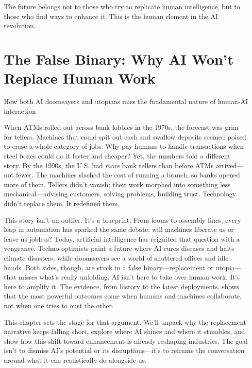 \documentclass[
  Letterpaper,
]{scrbook}
\begin{document}
The future belongs not to those who try to replicate human intelligence,
but to those who find ways to enhance it. This is the human element in
the AI revolution.


\chapter{The False Binary: Why AI Won't Replace Human
Work}\label{the-false-binary-why-ai-wont-replace-human-work}

How both AI doomsayers and utopians miss the fundamental nature of
human-AI interaction

\hfill\break

When ATMs rolled out across bank lobbies in the 1970s, the forecast was
grim for tellers. Machines that could spit out cash and swallow deposits
seemed poised to erase a whole category of jobs. Why pay humans to
handle transactions when steel boxes could do it faster and cheaper?
Yet, the numbers told a different story. By the 1990s, the U.S. had
\emph{more} bank tellers than before ATMs arrived---not fewer. The
machines slashed the cost of running a branch, so banks opened more of
them. Tellers didn't vanish; their work morphed into something less
mechanical---advising customers, solving problems, building trust.
Technology didn't replace them. It redefined them.

This story isn't an outlier. It's a blueprint. From looms to assembly
lines, every leap in automation has sparked the same debate: will
machines liberate us or leave us jobless? Today, artificial intelligence
has reignited that question with a vengeance. Techno-optimists paint a
future where AI cures diseases and halts climate disasters, while
doomsayers see a world of shuttered offices and idle hands. Both sides,
though, are stuck in a false binary---replacement or utopia---that
misses what's really unfolding. AI isn't here to take over human work.
It's here to amplify it. The evidence, from history to the latest
deployments, shows that the most powerful outcomes come when humans and
machines collaborate, not when one tries to oust the other.

This chapter sets the stage for that argument. We'll unpack why the
replacement narrative keeps falling short, explore where AI shines and
where it stumbles, and show how this shift toward enhancement is already
reshaping industries. The goal isn't to dismiss AI's potential or its
disruptions---it's to reframe the conversation around what it can
realistically do alongside us.
\end{document}
